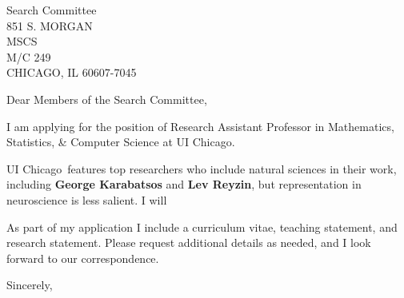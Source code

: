 \documentclass[11pt,a4paper]{letter}
\begin{document}

\def\School{UI Chicago}

\begin{letter}
{Search Committee\\
851 S. MORGAN\\
MSCS\\
M/C 249\\
CHICAGO, IL 60607-7045\\
}


\opening{Dear Members of the Search Committee,}

I am applying for the position of Research Assistant Professor in Mathematics, Statistics, \& Computer Science
 at \School. 



\School~features top researchers who include natural sciences in their work, including \textbf{George Karabatsos} and \textbf{Lev Reyzin}, but representation in neuroscience is less salient. I will 



As part of my application I include a curriculum vitae, teaching statement, and research statement. Please request additional details as needed, and I look forward to our correspondence.

\closing{Sincerely,}
\end{letter}
\end{document}
